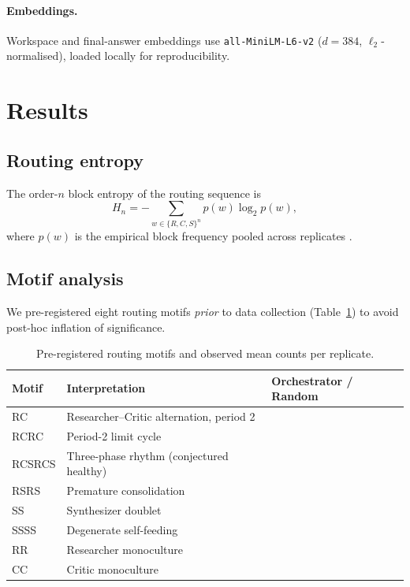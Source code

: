 \documentclass{article}
\begin{document}
\paragraph{Embeddings.}
Workspace and final-answer embeddings use
\texttt{all-MiniLM-L6-v2} \citep{reimers2019sentence}
($d=384$, $\ell_2$-normalised), loaded locally for reproducibility.

\section{Results}

\subsection{Routing entropy}

The order-$n$ block entropy of the routing sequence is
\begin{equation}
  H_n = -\sum_{w \in \{R,C,S\}^n} p(w)\log_2 p(w),
  \label{eq:block_entropy}
\end{equation}
where $p(w)$ is the empirical block frequency pooled across replicates
\citep{cover2006elements}.


\subsection{Motif analysis}

We pre-registered eight routing motifs \emph{prior} to data collection
(Table~\ref{tab:motifs}) to avoid post-hoc inflation of significance.

\begin{table}[htbp]
  \centering
  \caption{Pre-registered routing motifs and observed mean counts per replicate.}
  \label{tab:motifs}
  \small
  \begin{tabular}{lll}
    \toprule
    Motif & Interpretation & Orchestrator / Random \\
    \midrule
    RC     & Researcher--Critic alternation, period 2 & \\
    RCRC   & Period-2 limit cycle                     & \\
    RCSRCS & Three-phase rhythm (conjectured healthy)  & \\
    RSRS   & Premature consolidation                  & \\
    SS     & Synthesizer doublet                      & \\
    SSSS   & Degenerate self-feeding                  & \\
    RR     & Researcher monoculture                   & \\
    CC     & Critic monoculture                       & \\
    \bottomrule
  \end{tabular}
\end{table}
\end{document}
